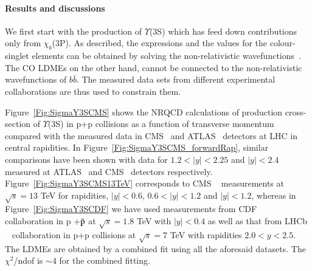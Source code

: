 \documentclass[review]{elsarticle}
\begin{document}
\paragraph{Results and discussions}
\label{sec:results}
We first start with the production of $\Upsilon$(3S) which has feed down contributions
only from $\chi_{b}$(3P).
As described, the expressions and the values for the 
colour-singlet elements can be obtained by solving the non-relativistic 
wavefunctions~\cite{Cho:1995vh}. 
The CO LDMEs on the other hand, cannot be connected to the non-relativistic
wavefunctions of $b \bar b$. 
The measured data sets from different experimental collaborations are thus used to constrain them.

Figure~\ref{Fig:SigmaY3SCMS} shows the NRQCD calculations of production cross-section of 
$\Upsilon$(3S) in p+p collisions as a function of transverse momentum compared with the 
measured data in CMS~\cite{Khachatryan:2015qpa} and ATLAS~\cite{Aad:2012dlq} 
detectors at LHC in central rapidities. In Figure~\ref{Fig:SigmaY3SCMS_forwardRap},
similar comparisons have been shown with data for $1.2<|y|<2.25$ and $|y|<2.4$
measured at ATLAS~\cite{Aad:2012dlq} and CMS~\cite{Chatrchyan:2013yna} detectors 
respectively. Figure~\ref{Fig:SigmaY3SCMS13TeV} corresponds to CMS ~\cite{Sirunyan:2017qdw}
measurements at $\sqrt{s}=13$ TeV for rapidities, $|y|<0.6$, $0.6<|y|<1.2$ and $|y|<1.2$, whereas in 
Figure~\ref{Fig:SigmaY3SCDF} we have used measurements from CDF~\cite{Acosta:2001gv}
collaboration in p +{$\bar {\rm p}$} at $\sqrt{s}=1.8$ TeV with $|y|<0.4$ as well as
that from LHCb ~\cite{LHCb:2012aa}
collaboration in p+p collisions at $\sqrt{s}=7$ TeV with rapidities $2.0<y<2.5$.
The LDMEs are obtained by a combined fit using all the aforesaid datasets.
The $\chi^2$/ndof is $\sim 4 $ for the combined fitting.
\end{document}
